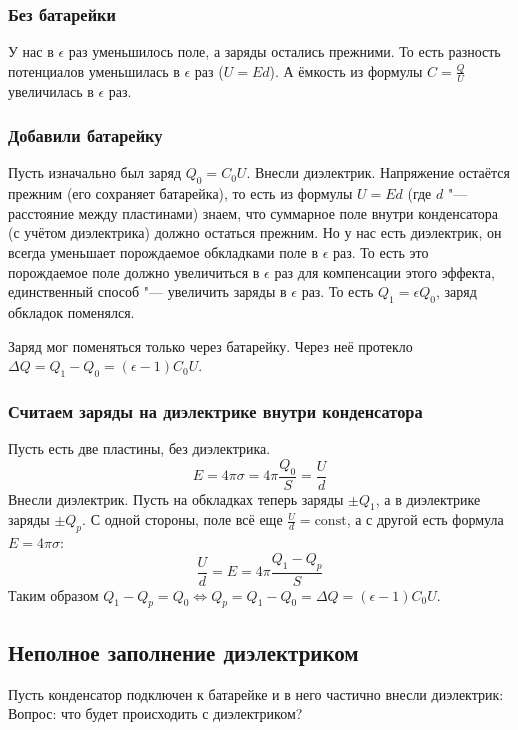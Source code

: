 		\subsubsection{Без батарейки}
			У нас в $\epsilon$ раз уменьшилось поле, а заряды остались прежними.
			То есть разность потенциалов уменьшилась в $\epsilon$ раз ($U=Ed$).
			А ёмкость из формулы $C=\frac{Q}{U}$ увеличилась в $\epsilon$ раз.

		\subsubsection{Добавили батарейку}
			Пусть изначально был заряд $Q_0=C_0U$.
			Внесли диэлектрик.
			Напряжение остаётся прежним (его сохраняет батарейка), то есть из формулы $U=Ed$ (где $d$ "--- расстояние между пластинами)
			знаем, что суммарное поле внутри конденсатора (с учётом диэлектрика) должно остаться прежним.
			Но у нас есть диэлектрик, он всегда уменьшает порождаемое обкладками поле в $\epsilon$ раз.
			То есть это порождаемое поле должно увеличиться в $\epsilon$ раз для компенсации этого эффекта,
			единственный способ "--- увеличить заряды в $\epsilon$ раз.
			То есть $Q_1=\epsilon Q_0$, заряд обкладок поменялся.
			\begin{Rem}
				Заряд мог поменяться только через батарейку.
				Через неё протекло $\Delta Q = Q_1 - Q_0 = (\epsilon - 1)C_0U$.
			\end{Rem}

		\subsubsection{Считаем заряды на диэлектрике внутри конденсатора}
			Пусть есть две пластины, без диэлектрика.
			\[ E = 4\pi \sigma = 4\pi \frac{Q_0}S = \frac U d\]
			Внесли диэлектрик.
			Пусть на обкладках теперь заряды $\pm Q_1$, а в диэлектрике заряды $\pm Q_p$.
			С одной стороны, поле всё еще $\frac U d = \mathrm{const}$, а с другой есть формула $E = 4\pi \sigma$:
			\[ \frac U d = E = 4\pi \frac{Q_1-Q_p}{S}\]
			Таким образом $Q_1-Q_p=Q_0 \iff Q_p=Q_1-Q_0=\Delta Q = (\epsilon-1)C_0U$.

	\subsection{Неполное заполнение диэлектриком}
		Пусть конденсатор подключен к батарейке и в него частично внесли диэлектрик:
		Вопрос: что будет происходить с диэлектриком?

